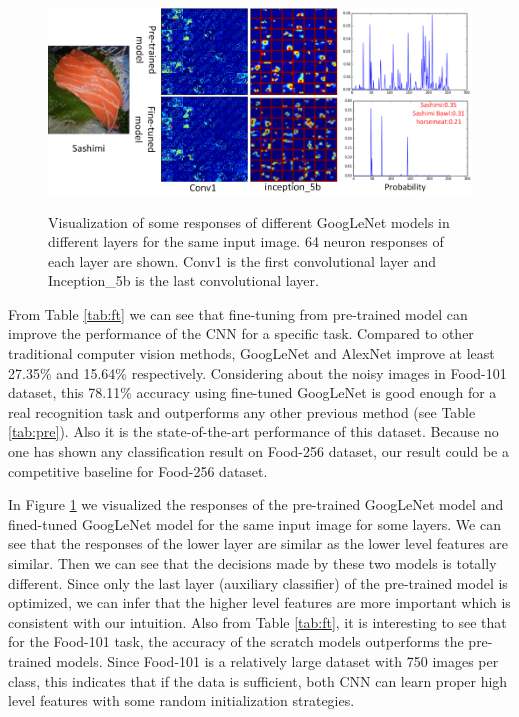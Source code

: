 \begin{figure}[htbp]
  \centering
  \includegraphics[scale=0.5]{fig/sashimi.png}\\
  \caption{Visualization of some responses of different GoogLeNet models in different layers for the same input image. 64 neuron responses of each layer are shown. Conv1 is the first convolutional layer and Inception\_5b is the last convolutional layer. }
   \label{fig:sashimi}
\end{figure}
From Table \ref{tab:ft} we can see that fine-tuning from pre-trained model can improve the performance of the CNN for a specific task. Compared to other traditional computer vision methods, GoogLeNet and AlexNet improve at least 27.35\% and 15.64\% respectively. Considering about the noisy images in Food-101 dataset, this 78.11\% accuracy using fine-tuned GoogLeNet is good enough for a real recognition task and outperforms any other previous method (see Table \ref{tab:pre}). Also it is the state-of-the-art performance of this dataset. Because no one has shown any classification result on Food-256 dataset, our result could be a competitive baseline for Food-256 dataset.

In Figure \ref{fig:sashimi} we visualized the responses of the pre-trained GoogLeNet model and fined-tuned GoogLeNet model for the same input image for some layers. We can see that the responses of the lower layer are similar as the lower level features are similar. Then we can see that the decisions made by these two models is totally different. Since only the last layer (auxiliary classifier) of the pre-trained model is optimized, we can infer that the higher level features are more important which is consistent with our intuition. Also from Table \ref{tab:ft}, it is interesting to see that for the Food-101 task, the accuracy of  the scratch models outperforms the pre-trained models. Since Food-101 is a relatively large dataset with 750 images per class, this indicates that if the data is sufficient, both CNN can learn proper high level features with some random initialization strategies.

